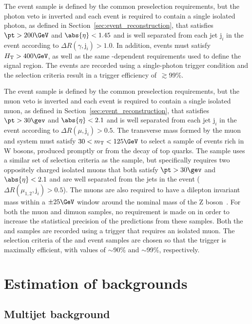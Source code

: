 The \gj event sample is defined by the common preselection
requirements, but the photon veto is inverted and each event is
required to contain a single isolated photon, as defined in
Section~\ref{sec:event_reconstruction}, that satisfies $\pt > 200\GeV$
and $\abs{\eta} < 1.45$ and is well separated from each jet
$\mathrm{j}_i$ in the event according to $\Delta
R(\gamma,\mathrm{j}_i) > 1.0$.
In addition, events must satisfy $\scalht > 400\GeV$, as well as the
same \scalht-dependent \alphat requirements used to define the signal
region. The events are recorded using a single-photon trigger
condition and the selection criteria result in a trigger efficiency
of~$\gtrsim$99\%.

The \mj event sample is defined by the common preselection
requirements, but the muon veto is inverted and each event is required
to contain a single isolated muon, as defined in
Section~\ref{sec:event_reconstruction}, that satisfies $\pt > 30\gev$
and $\abs{\eta} < 2.1$ and is well separated from each jet
$\mathrm{j}_i$ in the event according to $\Delta R(\mu,\mathrm{j}_i) >
0.5$.
The transverse mass formed by the muon \pt and \ptvecmiss system must
satisfy $30 < m_\mathrm{T} < 125\GeV$ to select a sample of events rich
in W bosons, produced promptly or from the decay of top quarks. The
\mmj sample uses a similar set of selection criteria as the \mj
sample, but specifically requires two oppositely charged isolated
muons that both satisfy $\pt > 30\gev$ and $\abs{\eta} < 2.1$ and are
well separated from the jets in the event ($\Delta
R(\mu_{1,2},\mathrm{j}_i) > 0.5$). The muons are also required to have
a dilepton invariant mass within a $\pm 25\GeV$ window around the
nominal mass of the Z boson~\cite{1674-1137-38-9-090001}. For both the
muon and dimuon samples, no requirement is made on \alphat in order to
increase the statistical precision of the predictions from these
samples. Both the \mj and \mmj samples are recorded using a trigger
that requires an isolated muon. The selection criteria of the \mj and
\mmj event samples are chosen so that the trigger is maximally
efficient, with values of $\sim$90\% and $\sim$99\%, respectively.

\section{Estimation of backgrounds}
\label{sec:backgrounds}

\subsection{Multijet background}
\label{sec:qcd_background}

